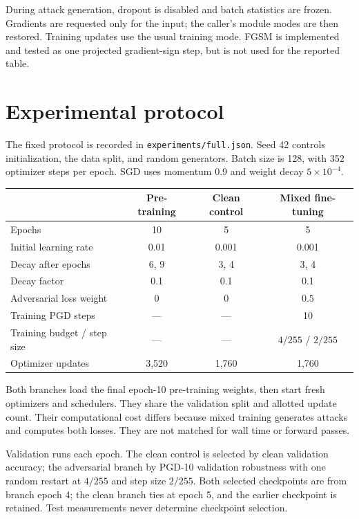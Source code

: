 \documentclass[10pt,a4paper]{article}
\begin{document}
During attack generation, dropout is disabled and batch statistics are frozen.
Gradients are requested only for the input; the caller's module modes are then
restored. Training updates use the usual training mode. FGSM is implemented and
tested as one projected gradient-sign step, but is not used for the reported table.

\section{Experimental protocol}
The fixed protocol is recorded in \texttt{experiments/full.json}. Seed 42 controls
initialization, the data split, and random generators. Batch size is 128, with
352 optimizer steps per epoch. SGD uses momentum 0.9 and weight decay $5\times10^{-4}$.

\begin{center}
\small
\begin{tabular}{@{}lccc@{}}
\toprule
 & Pre-training & Clean control & Mixed fine-tuning\\
\midrule
Epochs & 10 & 5 & 5\\
Initial learning rate & 0.01 & 0.001 & 0.001\\
Decay after epochs & 6, 9 & 3, 4 & 3, 4\\
Decay factor & 0.1 & 0.1 & 0.1\\
Adversarial loss weight & 0 & 0 & 0.5\\
Training PGD steps & --- & --- & 10\\
Training budget / step size & --- & --- & $4/255$ / $2/255$\\
Optimizer updates & 3,520 & 1,760 & 1,760\\
\bottomrule
\end{tabular}
\end{center}

Both branches load the final epoch-10 pre-training weights, then start fresh
optimizers and schedulers. They share the validation split and allotted update
count. Their computational cost differs because mixed training generates attacks
and computes both losses. They are not matched for wall time or forward passes.

Validation runs each epoch. The clean control is selected by clean validation
accuracy; the adversarial branch by PGD-10 validation robustness with one random
restart at $4/255$ and step size $2/255$. Both selected checkpoints are from
branch epoch 4; the clean branch ties at epoch 5, and the earlier checkpoint is
retained. Test measurements never determine checkpoint selection.
\end{document}
